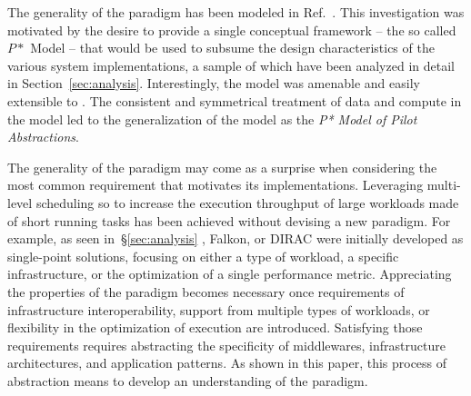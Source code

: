 \documentclass{sig-alternate}
\begin{document}
The generality of the \pilot paradigm has been modeled in
Ref.~\cite{Luckow:2008la}. This investigation was motivated by the
desire to provide a single conceptual framework -- the so called $P*$
Model -- that would be used to subsume the design characteristics of the
various \pilot system implementations, a sample of which have been
analyzed in detail in Section~\ref{sec:analysis}.  Interestingly, the \pstar model was
amenable and easily extensible to \pilotdata.  The consistent and
symmetrical treatment of data and compute in the model led to the
generalization of the model as the {\it P* Model of Pilot Abstractions}.


The generality of the \pilot paradigm may come as a surprise when
considering the most common requirement that motivates its
implementations. Leveraging multi-level scheduling so to increase the
execution throughput of large workloads made of short running tasks has
been achieved without devising a new paradigm. For example, as seen
in~\S\ref{sec:analysis} \panda, Falkon, or DIRAC were initially developed as
single-point solutions, focusing on either a type of workload, a
specific infrastructure, or the optimization of a single performance
metric. Appreciating the properties of the \pilot paradigm becomes
necessary once requirements of infrastructure interoperability, support
from multiple types of workloads, or flexibility in the optimization of
execution are introduced. Satisfying those requirements requires
abstracting the specificity of middlewares, infrastructure
architectures, and application patterns. As shown in this paper, this
process of abstraction means to develop an understanding of the \pilot
paradigm.
\end{document}
